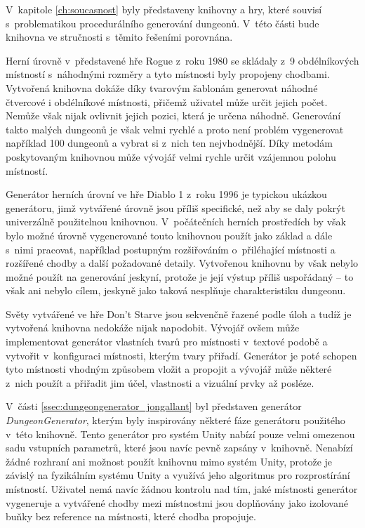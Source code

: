 V~kapitole \ref{ch:soucasnost} byly představeny knihovny a hry, které souvisí s~problematikou procedurálního generování dungeonů.
V~této části bude knihovna ve stručnosti s~těmito řešeními porovnána.
\par
Herní úrovně v~představené hře Rogue z~roku 1980 se skládaly z~9 obdélníkových místností s~náhodnými rozměry a tyto místnosti byly propojeny chodbami.
Vytvořená knihovna dokáže díky tvarovým šablonám generovat náhodné čtvercové i obdélníkové místnosti, přičemž uživatel může určit jejich počet.
Nemůže však nijak ovlivnit jejich pozici, která je určena náhodně.
Generování takto malých dungeonů je však velmi rychlé a proto není problém vygenerovat například 100 dungeonů a vybrat si z~nich ten nejvhodnější.
Díky metodám poskytovaným knihovnou může vývojář velmi rychle určit vzájemnou polohu místností.
\par
Generátor herních úrovní ve hře Diablo 1 z~roku 1996 je typickou ukázkou generátoru, jimž vytvářené úrovně jsou příliš specifické, než aby se daly pokrýt univerzálně použitelnou knihovnou.
V~počátečních herních prostředích by však bylo možné úrovně vygenerované touto knihovnou použít jako základ a dále s~nimi pracovat, například postupným rozšiřováním o~přiléhající místnosti a rozšířené chodby a další požadované detaily.
Vytvořenou knihovnu by však nebylo možné použít na generování jeskyní, protože je její výstup příliš uspořádaný -- to však ani nebylo cílem, jeskyně jako taková nesplňuje charakteristiku dungeonu.
\par
Světy vytvářené ve hře Don't Starve jsou sekvenčně řazené podle úloh a tudíž je vytvořená knihovna nedokáže nijak napodobit.
Vývojář ovšem může implementovat generátor vlastních tvarů pro místnosti v~textové podobě a vytvořit v~konfiguraci místnosti, kterým tvary přiřadí.
Generátor je poté schopen tyto místnosti vhodným způsobem vložit a propojit a vývojář může některé z~nich použít a přiřadit jim účel, vlastnosti a vizuální prvky až posléze.
\par
V~části \ref{ssec:dungeongenerator_jongallant} byl představen generátor \textit{DungeonGenerator}, kterým byly inspirovány některé fáze generátoru použitého v~této knihovně.
Tento generátor pro systém Unity nabízí pouze velmi omezenou sadu vstupních parametrů, které jsou navíc pevně zapsány v~knihovně.
Nenabízí žádné rozhraní ani možnost použít knihovnu mimo systém Unity, protože je závislý na fyzikálním systému Unity a využívá jeho algoritmus pro rozprostírání místností.
Uživatel nemá navíc žádnou kontrolu nad tím, jaké místnosti generátor vygeneruje a vytvářené chodby mezi místnostmi jsou doplňovány jako izolované buňky bez reference na místnosti, které chodba propojuje.

